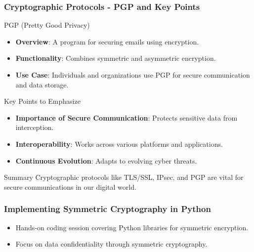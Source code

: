 \documentclass{beamer}
\begin{document}
\begin{frame}[fragile]
    \frametitle{Cryptographic Protocols - PGP and Key Points}
    
    \begin{block}{PGP (Pretty Good Privacy)}
        \begin{itemize}
            \item \textbf{Overview}: A program for securing emails using encryption.
            \item \textbf{Functionality}: Combines symmetric and asymmetric encryption.
            \item \textbf{Use Case}: Individuals and organizations use PGP for secure communication and data storage.
        \end{itemize}
    \end{block}

    \begin{block}{Key Points to Emphasize}
        \begin{itemize}
            \item \textbf{Importance of Secure Communication}: Protects sensitive data from interception.
            \item \textbf{Interoperability}: Works across various platforms and applications.
            \item \textbf{Continuous Evolution}: Adapts to evolving cyber threats.
        \end{itemize}
    \end{block}

    \begin{block}{Summary}
        Cryptographic protocols like TLS/SSL, IPsec, and PGP are vital for secure communications in our digital world.
    \end{block}
\end{frame}

\begin{frame}[fragile]
    \frametitle{Implementing Symmetric Cryptography in Python}
    \begin{itemize}
        \item Hands-on coding session covering Python libraries for symmetric encryption.
        \item Focus on data confidentiality through symmetric cryptography.
    \end{itemize}
\end{frame}
\end{document}
